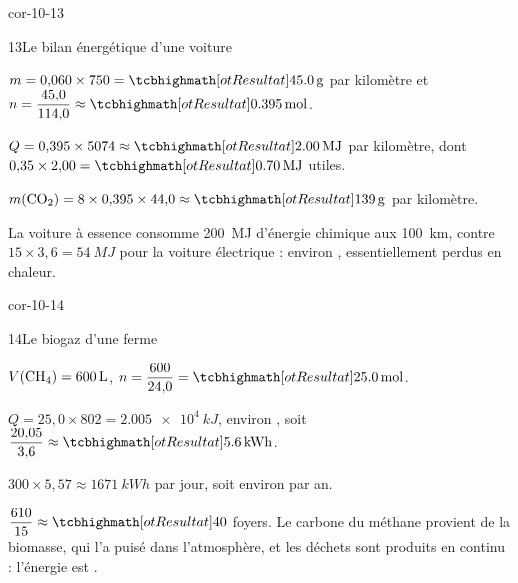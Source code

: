 \begin{blocLivre}{cor-10-13}
\begin{corrige}{13}{Le bilan énergétique d'une voiture}
\begin{questions}
\item $m=0{,}060\times750=\res{\qty{45,0}{g}}$ par kilomètre et $n=\dfrac{45{,}0}{114{,}0}\approx\res{\qty{0,395}{mol}}$.
\item $Q=0{,}395\times5074\approx\res{\qty{2,00}{MJ}}$ par kilomètre, dont $0{,}35\times2{,}00=\res{\qty{0,70}{MJ}}$ utiles.
\item $m(\ce{CO2})=8\times0{,}395\times44{,}0\approx\res{\qty{139}{g}}$ par kilomètre.
\item La voiture à essence consomme \qty{200}{MJ} d'énergie chimique aux \qty{100}{km}, contre $15\times3{,}6=\qty{54}{MJ}$ pour la voiture
électrique : environ , essentiellement perdus en chaleur.
\end{questions}
\end{corrige}
\end{blocLivre}
\begin{blocLivre}{cor-10-14}
\begin{corrige}{14}{Le biogaz d'une ferme}
\begin{questions}
\item $V(\ce{CH4})=\qty{600}{L}$, $n=\dfrac{600}{24{,}0}=\res{\qty{25,0}{mol}}$.
\item $Q=25{,}0\times802=\qty{2,005e4}{kJ}$, environ , soit $\dfrac{20{,}05}{3{,}6}\approx\res{\qty{5,6}{kWh}}$.
\item $300\times5{,}57\approx\qty{1671}{kWh}$ par jour, soit environ  par an.
\item $\dfrac{610}{15}\approx\res{40}$ foyers. Le carbone du méthane provient de la biomasse, qui l'a puisé dans l'atmosphère, et les
déchets sont produits en continu : l'énergie est .
\end{questions}
\end{corrige}
\end{blocLivre}
